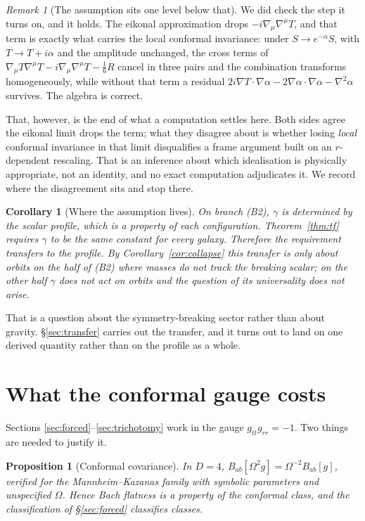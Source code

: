 \documentclass[11pt]{article}
\newtheorem{proposition}[theorem]{Proposition}
\newtheorem{corollary}[theorem]{Corollary}
\theoremstyle{definition}
\theoremstyle{remark}
\newtheorem{remark}[theorem]{Remark}
\begin{document}
\begin{remark}[The assumption sits one level below that]
We did check the step it turns on, and it holds.  The eikonal approximation
drops \(-i\nabla_{\mu}\nabla^{\mu}T\), and that term is exactly what carries
the local conformal invariance: under \(S\to e^{-\alpha}S\), with
\(T\to T+i\alpha\) and the amplitude unchanged, the cross terms of
\(\nabla_{\mu}T\nabla^{\mu}T-i\nabla_{\mu}\nabla^{\mu}T-\tfrac16R\) cancel in
three pairs and the combination transforms homogeneously, while without that
term a residual \(2i\nabla T\!\cdot\!\nabla\alpha-2\nabla\alpha\!\cdot\!\nabla\alpha-\nabla^{2}\alpha\)
survives.  The algebra is correct.

That, however, is the end of what a computation settles here.  Both sides
agree the eikonal limit drops the term; what they disagree about is whether
losing \emph{local} conformal invariance in that limit disqualifies a frame
argument built on an \(r\)-dependent rescaling.  That is an inference about
which idealisation is physically appropriate, not an identity, and no exact
computation adjudicates it.  We record where the disagreement sits and stop
there.
\end{remark}

\begin{corollary}[Where the assumption lives]
On branch (B2), \(\gamma\) is determined by the scalar profile, which is a
property of each configuration.  Theorem~\ref{thm:tf} requires \(\gamma\) to
be the same constant for every galaxy.  Therefore the requirement transfers
to the profile.  By Corollary~\ref{cor:collapse} this transfer is only
\emph{about orbits} on the half of (B2) where masses do not track the breaking
scalar; on the other half \(\gamma\) does not act on orbits and the question
of its universality does not arise.
\end{corollary}

That is a question about the symmetry-breaking sector rather than about
gravity.  \S\ref{sec:transfer} carries out the transfer, and it turns out to
land on one derived quantity rather than on the profile as a whole.

\section{What the conformal gauge costs}
\label{sec:gauge}

Sections \ref{sec:forced}--\ref{sec:trichotomy} work in the gauge
\(g_{tt}g_{rr}=-1\).  Two things are needed to justify it.

\begin{proposition}[Conformal covariance]
In \(D=4\), \(B_{ab}[\Omega^{2}g]=\Omega^{-2}B_{ab}[g]\), verified for the
Mannheim--Kazanas family with symbolic parameters and \emph{unspecified}
\(\Omega\).  Hence Bach flatness is a property of the conformal class, and
the classification of \S\ref{sec:forced} classifies classes.
\end{proposition}
\end{document}
